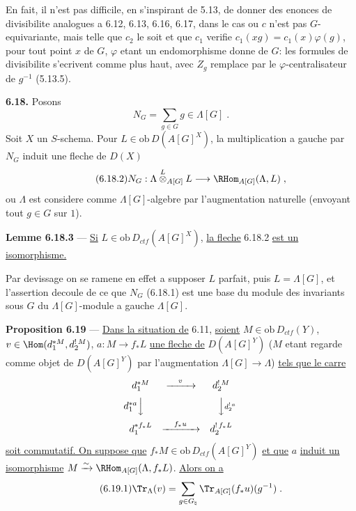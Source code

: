 En fait, il n'est pas difficile, en s'inspirant de 5.13, de donner des enonces de divisibilite analogues a 6.12, 6.13, 6.16, 6.17, dans le cas ou $c$ n'est pas $G$-equivariante, mais telle que $c_2$ le soit et que $c_1$ verifie $c_1(xg) = c_1(x)\varphi(g)$, pour tout point $x$ de $G$, $\varphi$ etant un endomorphisme donne de $G$: les formules de divisibilite s'ecrivent comme plus haut, avec $Z_g$ remplace par le $\varphi$-centralisateur de $g^{-1}$ (5.13.5).

\medskip
\noindent\textbf{6.18.} Posons
\begin{equation}\tag{6.18.1}
N_G = \sum_{g \in G} g \in \Lambda[G]\;.
\end{equation}
Soit $X$ un $S$-schema. Pour $L \in \mathrm{ob}\, D(A[G]^X)$, la multiplication a gauche par $N_G$ induit une fleche de $D(X)$
\begin{equation}\tag{6.18.2}
N_G : \Lambda \overset{L}{\otimes}_{A[G]} L \longrightarrow \RHom_{A[G]}(\Lambda, L)\;,
\end{equation}
ou $\Lambda$ est considere comme $\Lambda[G]$-algebre par l'augmentation naturelle (envoyant tout $g \in G$ sur $1$).

\medskip
\noindent\textbf{Lemme 6.18.3} --- \underline{Si} $L \in \mathrm{ob}\, D_{ctf}(A[G]^X)$, \underline{la fleche} 6.18.2 \underline{est un isomorphisme.}

Par devissage on se ramene en effet a supposer $L$ parfait, puis $L = \Lambda[G]$, et l'assertion decoule de ce que $N_G$ (6.18.1) est une base du module des invariants sous $G$ du $\Lambda[G]$-module a gauche $\Lambda[G]$.

\medskip
\noindent\textbf{Proposition 6.19} --- \underline{Dans la situation de} 6.11, \underline{soient} $M \in \mathrm{ob}\, D_{ctf}(Y)$, $v \in \Hom(d_1^{*M}, d_2^{!\,M})$, $a : M \longrightarrow f_* L$ \underline{une fleche de} $D(A[G]^Y)$ ($M$ etant regarde comme objet de $D(A[G]^Y)$ par l'augmentation $\Lambda[G] \longrightarrow \Lambda$) \underline{tels que le carre}
\[
\begin{array}{ccc}
d_1^{*M} & \xrightarrow{\quad v\quad} & d_2^{!\,M} \\[6pt]
\llap{$d_1^{*a}$}\Big\downarrow\rlap{$\quad$} & & \Big\downarrow\rlap{$\scriptstyle d_2^{!\,a}$} \\[8pt]
d_1^{*f_* L} & \xrightarrow{\quad f_* u\quad} & d_2^{!\,f_* L}
\end{array}
\]
\underline{soit commutatif. On suppose que} $f_* M \in \mathrm{ob}\, D_{ctf}(A[G]^Y)$ \underline{et que} $a$ \underline{induit un isomorphisme} $M \xrightarrow{\sim} \RHom_{A[G]}(\Lambda, f_* L)$. \underline{Alors on a}
\begin{equation}\tag{6.19.1}
\Tr_\Lambda(v) = \sum_{g \in G_\natural} \Tr_{A[G]}(f_* u)(g^{-1})\;.
\end{equation}

